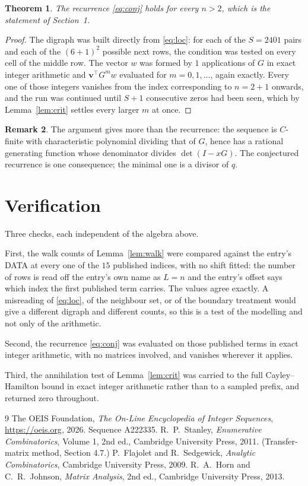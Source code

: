\documentclass[11pt,a4paper]{article}
\theoremstyle{plain}
\newtheorem{theorem}{Theorem}
\theoremstyle{definition}
\newtheorem{remark}[theorem]{Remark}
\begin{document}
\begin{theorem}
The recurrence \eqref{eq:conj} holds for every $n>2$, which is the statement of
Section~1.
\end{theorem}

\begin{proof}
The digraph was built directly from \eqref{eq:loc}: for each of the $S=2401$ pairs and each
of the $(6+1)^{2}$ possible next rows, the condition was tested on every cell of
the middle row. The vector $w$ was formed by $1$ applications of $G$ in exact integer
arithmetic and $\mathbf{v}^{\!\top}G^{m}w$ evaluated for $m=0,1,\dots$, again exactly.
Every one of those integers vanishes from the index corresponding to $n=2+1$ onwards,
and the run was continued until $S+1$ consecutive zeros had been seen, which by
Lemma~\ref{lem:crit} settles every larger $m$ at once.
\end{proof}

\begin{remark}
The argument gives more than the recurrence: the sequence is $C$-finite with characteristic
polynomial dividing that of $G$, hence has a rational generating function whose denominator
divides $\det(I-xG)$. The conjectured recurrence is one consequence; the minimal one is a
divisor of $q$.
\end{remark}

\section{Verification}

Three checks, each independent of the algebra above.

First, the walk counts of Lemma~\ref{lem:walk} were compared against the entry's DATA at
every one of the $15$ published indices, with no shift fitted: the number of rows is
read off the entry's own name as $L=n$ and the entry's offset says which index the first
published term carries. The values agree exactly. A misreading of \eqref{eq:loc}, of the
neighbour set, or of the boundary treatment would give a different digraph and different
counts, so this is a test of the modelling and not only of the arithmetic.

Second, the recurrence \eqref{eq:conj} was evaluated on those published terms in exact
integer arithmetic, with no matrices involved, and vanishes wherever it applies.

Third, the annihilation test of Lemma~\ref{lem:crit} was carried to the full
Cayley--Hamilton bound in exact integer arithmetic rather than to a sampled prefix, and
returned zero throughout.

\begin{thebibliography}{9}
 The OEIS Foundation, \emph{The On-Line Encyclopedia of Integer
Sequences}, \url{https://oeis.org}, 2026. Sequence A222335.
 R.~P.~Stanley, \emph{Enumerative Combinatorics}, Volume 1, 2nd ed.,
Cambridge University Press, 2011. (Transfer-matrix method, Section 4.7.)
 P.~Flajolet and R.~Sedgewick, \emph{Analytic Combinatorics}, Cambridge
University Press, 2009.
 R.~A.~Horn and C.~R.~Johnson, \emph{Matrix Analysis}, 2nd ed., Cambridge
University Press, 2013.
\end{thebibliography}
\end{document}

